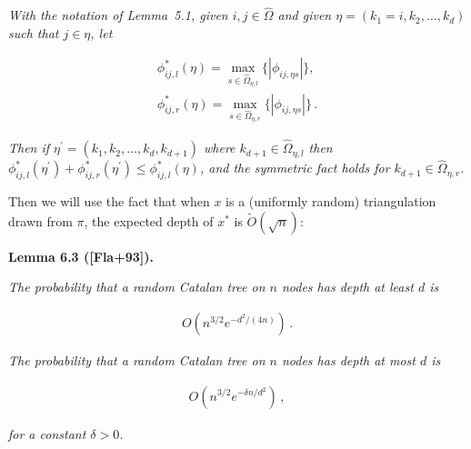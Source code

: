 \emph{With the notation of Lemma 5.1, given $i,j\in\hat{\Omega}$ and given $\eta=(k_{1}=i,k_{2},\dots,k_{d})$ such that $j\in\eta$, let}\par


\[\begin{gathered}
\displaystyle\phi_{ij,l}^{*}(\eta) \displaystyle=\max_{s\in\hat{\Omega}_{\eta,l}}\{|\phi_{ij,\eta s}|\}, \\
\displaystyle\phi_{ij,r}^{*}(\eta) \displaystyle=\max_{s\in\hat{\Omega}_{\eta,r}}\{|\phi_{ij,\eta s}|\}\,.
\end{gathered}\]


\emph{Then if $\eta^{\prime}=(k_{1},k_{2},\dots,k_{d},k_{d+1})$ where $k_{d+1}\in\hat{\Omega}_{\eta,l}$ then $\phi_{ij,l}^{*}(\eta^{\prime})+\phi_{ij,r}^{*}(\eta^{\prime})\leq\phi_{ij,l}^{*}(\eta)$, and the symmetric fact holds for $k_{d+1}\in\hat{\Omega}_{\eta,r}$.}\par






Then we will use the fact that when $x$ is a (uniformly random) triangulation drawn from $\pi$, the expected depth of $x^{*}$ is $\widetilde{O}(\sqrt{n})$:\par





\par\medskip\noindent\textbf{\textbf{Lemma 6.3}\textbf{ }([Fla+93])\textbf{.}}\par



\emph{The probability that a random Catalan tree on $n$ nodes has depth at least $d$ is}\par


\[\begin{gathered}
O\left(n^{3/2}e^{-d^{2}/(4n)}\right)\,.
\end{gathered}\]


\emph{The probability that a random Catalan tree on $n$ nodes has depth at most $d$ is}\par


\[\begin{gathered}
O\left(n^{3/2}e^{-\delta n/d^{2}}\right)\,,
\end{gathered}\]


\emph{for a constant $\delta>0$.}\par



